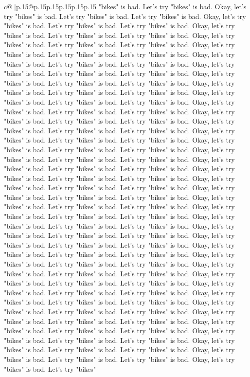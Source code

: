 \documentclass{article}
\begin{document}
{\begin{supertabular}{c@{$\;$}|p{.15\linewidth}@{}p{.15\linewidth}p{.15\linewidth}p{.15\linewidth}p{.15\linewidth}p{.15\linewidth}}
{{{"bikes" is bad. Let's try "bikes" is bad. Okay, let's try "bikes" is bad. Let's try "bikes" is bad. Let's try "bikes" is bad. Okay, let's try "bikes" is bad. Let's try "bikes" is bad. Let's try "bikes" is bad. Okay, let's try "bikes" is bad. Let's try "bikes" is bad. Let's try "bikes" is bad. Okay, let's try "bikes" is bad. Let's try "bikes" is bad. Let's try "bikes" is bad. Okay, let's try "bikes" is bad. Let's try "bikes" is bad. Let's try "bikes" is bad. Okay, let's try "bikes" is bad. Let's try "bikes" is bad. Let's try "bikes" is bad. Okay, let's try "bikes" is bad. Let's try "bikes" is bad. Let's try "bikes" is bad. Okay, let's try "bikes" is bad. Let's try "bikes" is bad. Let's try "bikes" is bad. Okay, let's try "bikes" is bad. Let's try "bikes" is bad. Let's try "bikes" is bad. Okay, let's try "bikes" is bad. Let's try "bikes" is bad. Let's try "bikes" is bad. Okay, let's try "bikes" is bad. Let's try "bikes" is bad. Let's try "bikes" is bad. Okay, let's try "bikes" is bad. Let's try "bikes" is bad. Let's try "bikes" is bad. Okay, let's try "bikes" is bad. Let's try "bikes" is bad. Let's try "bikes" is bad. Okay, let's try "bikes" is bad. Let's try "bikes" is bad. Let's try "bikes" is bad. Okay, let's try "bikes" is bad. Let's try "bikes" is bad. Let's try "bikes" is bad. Okay, let's try "bikes" is bad. Let's try "bikes" is bad. Let's try "bikes" is bad. Okay, let's try "bikes" is bad. Let's try "bikes" is bad. Let's try "bikes" is bad. Okay, let's try "bikes" is bad. Let's try "bikes" is bad. Let's try "bikes" is bad. Okay, let's try "bikes" is bad. Let's try "bikes" is bad. Let's try "bikes" is bad. Okay, let's try "bikes" is bad. Let's try "bikes" is bad. Let's try "bikes" is bad. Okay, let's try "bikes" is bad. Let's try "bikes" is bad. Let's try "bikes" is bad. Okay, let's try "bikes" is bad. Let's try "bikes" is bad. Let's try "bikes" is bad. Okay, let's try "bikes" is bad. Let's try "bikes" is bad. Let's try "bikes" is bad. Okay, let's try "bikes" is bad. Let's try "bikes" is bad. Let's try "bikes" is bad. Okay, let's try "bikes" is bad. Let's try "bikes" is bad. Let's try "bikes" is bad. Okay, let's try "bikes" is bad. Let's try "bikes" is bad. Let's try "bikes" is bad. Okay, let's try "bikes" is bad. Let's try "bikes" is bad. Let's try "bikes" is bad. Okay, let's try "bikes" is bad. Let's try "bikes" is bad. Let's try "bikes" is bad. Okay, let's try "bikes" is bad. Let's try "bikes" is bad. Let's try "bikes" is bad. Okay, let's try "bikes" is bad. Let's try "bikes" is bad. Let's try "bikes" is bad. Okay, let's try "bikes" is bad. Let's try "bikes" is bad. Let's try "bikes" is bad. Okay, let's try "bikes" is bad. Let's try "bikes" is bad. Let's try "bikes" is bad. Okay, let's try "bikes" is bad. Let's try "bikes" is bad. Let's try "bikes" is bad. Okay, let's try "bikes" is bad. Let's try "bikes" is bad. Let's try "bikes" is bad. Okay, let's try "bikes" is bad. Let's try "bikes" is bad. Let's try "bikes" is bad. Okay, let's try "bikes" is bad. Let's try "bikes" is bad. Let's try "bikes" is bad. Okay, let's try "bikes" is bad. Let's try "bikes" is bad. Let's try "bikes" is bad. Okay, let's try "bikes" is bad. Let's try "bikes" }}}
\end{supertabular}}
\end{document}
